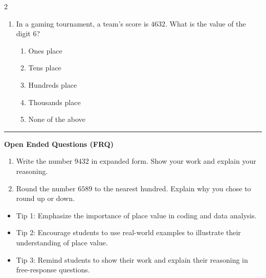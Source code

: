 \documentclass[10pt]{article}
\begin{document}
\begin{multicols}{2}
\begin{enumerate}[label=\textbf{Q\arabic*.}, leftmargin=*, itemsep=6pt, parsep=0pt]
  \item \small In a gaming tournament, a team's score is $4632$. What is the value of the digit $6$?
  \begin{enumerate}[label=(\Alph*), leftmargin=0.6cm, nosep, itemsep=2pt]
    \item Ones place
    \item Tens place
    \item Hundreds place
    \item Thousands place
    \item None of the above
  \end{enumerate}

\end{enumerate}
\end{multicols}

\vspace{-0.2cm}
\hrule
\vspace{0.2cm}
\textbf{\small Open Ended Questions (FRQ)}
\begin{enumerate}[label=\textbf{Q\arabic*.}, start=9, itemsep=5pt, topsep=0pt]

  \item \small Write the number $9432$ in expanded form. Show your work and explain your reasoning. \vspace{2cm}

  \item \small Round the number $6589$ to the nearest hundred. Explain why you chose to round up or down. \vspace{2cm}

\end{enumerate}

\vfill

\begin{tcolorbox}[colback=blue!5, colframe=mainblue!50, title=\small \textbf{Chef's Tips}, fonttitle=\bfseries, bottom=1mm]
\begin{itemize}[noitemsep, topsep=2pt, leftmargin=0.5cm]
  \item \scriptsize Tip 1: Emphasize the importance of place value in coding and data analysis.\item \scriptsize Tip 2: Encourage students to use real-world examples to illustrate their understanding of place value.\item \scriptsize Tip 3: Remind students to show their work and explain their reasoning in free-response questions.
\end{itemize}
\end{tcolorbox}
\end{document}
